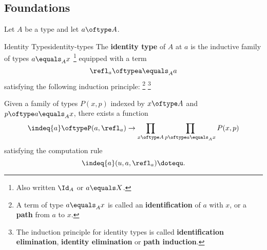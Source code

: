 \subsection{Foundations}\label{subsection-martin-löf-type-theory-identity-types-foundations}
Let $A$ be a type and let $a\oftype A$.
\begin{definition}{Identity Types}{identity-types}%
    The \textbf{identity type} of $A$ at $a$ is the inductive family of types $a\equals_{A}x$%
    \footnote{%
        Also written $\Id_{A}$ or $a\equals X$.%
        \par\vspace*{\TCBBoxCorrection}
    } %
    equipped with a term
    \[
        \refl_{a}%
        \oftype%
        a\equals_{A}a%
    \]%
    satisfying the following induction principle:%
    \footnote{%
        A term of type $a\equals_{A}x$ is called an \textbf{identification} of $a$ with $x$, or a \textbf{path} from $a$ to $x$.
    }%
    \footnote{%
        The induction principle for identity types is called \textbf{identification elimination}, \textbf{identity elimination} or \textbf{path induction}.
        \par\vspace*{\TCBBoxCorrection}
    }%
    \begin{itemize}
        \itemstar Given a family of types $P(x,p)$ indexed by $x\oftype A$ and $p\oftype a\equals_{A}x$, there exists a function
            \[
                \indeq{a}%
                \oftype%
                P(a,\refl_{a})%
                \to%
                \prod_{x\oftype A}\prod_{p\oftype a\equals_{A}x}P(x,p)%
            \]%
            satisfying the computation rule
            \[
                \indeq{a}(u,a,\refl_{a})%
                \doteq%
                u.%
            \]%
    \end{itemize}
\end{definition}
